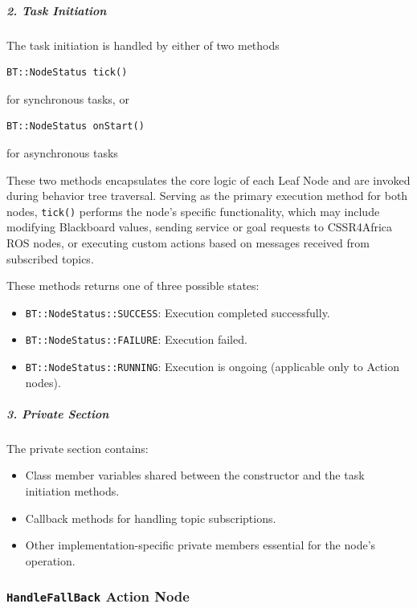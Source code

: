 \documentclass{CSSRforAfrica}
\begin{document}
\subparagraph{2. Task Initiation}
The task initiation is handled by either of two methods

\begin{lstlisting}[style=cppstyle]
    BT::NodeStatus tick()
\end{lstlisting}
for synchronous tasks, or 
\begin{lstlisting}[style=cppstyle]
    BT::NodeStatus onStart()
\end{lstlisting}
for asynchronous tasks


These two methods encapsulates the core logic of each Leaf Node and are invoked during behavior tree traversal. Serving as the primary execution method for both nodes, \texttt{\small tick()} performs the node's specific functionality, which may include modifying Blackboard values, sending service or goal requests to CSSR4Africa ROS nodes, or executing custom actions based on messages received from subscribed topics.

These methods returns one of three possible states:
\begin{itemize}
    \item \texttt{\small BT::NodeStatus::SUCCESS}: Execution completed successfully.
    \item \texttt{\small BT::NodeStatus::FAILURE}: Execution failed.
    \item \texttt{\small BT::NodeStatus::RUNNING}: Execution is ongoing (applicable only to Action nodes).
\end{itemize}

\subparagraph{3. Private Section}

The private section contains:
\begin{itemize}
    \item Class member variables shared between the constructor and the task initiation methods.
    \item Callback methods for handling topic subscriptions.
    \item Other implementation-specific private members essential for the node's operation.
\end{itemize}

\subsubsection{\texttt{\small HandleFallBack} Action Node}
\end{document}
